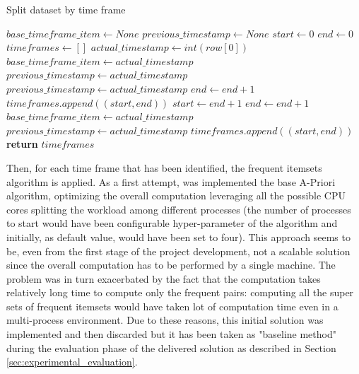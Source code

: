 \begin{algorithm*}
	\caption{Split dataset by time frame}
	\label{split_dataset_algorithm}
	\begin{algorithmic}[1]
			\State $base\_timeframe\_item\gets None$
			\State $previous\_timestamp\gets None$
			\State $start\gets 0$
			\State $end\gets 0$
			\State $timeframes\gets []$
				\State $actual\_timestamp\gets int(row[0])$
					\State $base\_timeframe\_item\gets actual\_timestamp$
					\State $previous\_timestamp\gets actual\_timestamp$
					\State $previous\_timestamp\gets actual\_timestamp$
					\State $end\gets end + 1$
				\Else
					\State $timeframes.append((start, end))$
					\State $start\gets end + 1$
					\State $end\gets end + 1$
					\State $base\_timeframe\_item\gets actual\_timestamp$
					\State $previous\_timestamp\gets actual\_timestamp$
				\EndIf
			\EndFor
				\State $timeframes.append((start, end))$
			\EndIf
			\State \textbf{return} $timeframes$
		\EndFunction
	\end{algorithmic}
\end{algorithm*}

Then, for each time frame that has been identified, the frequent itemsets algorithm is applied. As a first attempt, was implemented the base A-Priori algorithm, optimizing the overall computation leveraging all the possible CPU cores splitting the workload among different processes (the number of processes to start would have been configurable hyper-parameter of the algorithm and initially, as default value, would have been set to four). This approach seems to be, even from the first stage of the project development, not a scalable solution since the overall computation has to be performed by a single machine. The problem was in turn exacerbated by the fact that the computation takes relatively long time to compute only the frequent pairs: computing all the super sets of frequent itemsets would have taken lot of computation time even in a multi-process environment. Due to these reasons, this initial solution was implemented and then discarded but it has been taken as "baseline method" during the evaluation phase of the delivered solution as described in Section \ref{sec:experimental_evaluation}.

